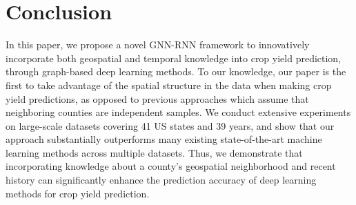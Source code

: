 \section{Conclusion}

In this paper, we propose a novel GNN-RNN framework to innovatively incorporate both geospatial and temporal knowledge into crop yield prediction, through graph-based deep learning methods. To our knowledge, our paper is the first to take advantage of the spatial structure in the data when making crop yield predictions, as opposed to previous approaches which assume that neighboring counties are independent samples. We conduct extensive experiments on large-scale datasets covering 41 US states and 39 years, and show that our approach substantially outperforms many existing state-of-the-art machine learning methods across multiple datasets. Thus, we demonstrate that incorporating knowledge about a county's geospatial neighborhood and recent  history can significantly enhance the prediction accuracy of deep learning methods for crop yield prediction. 


